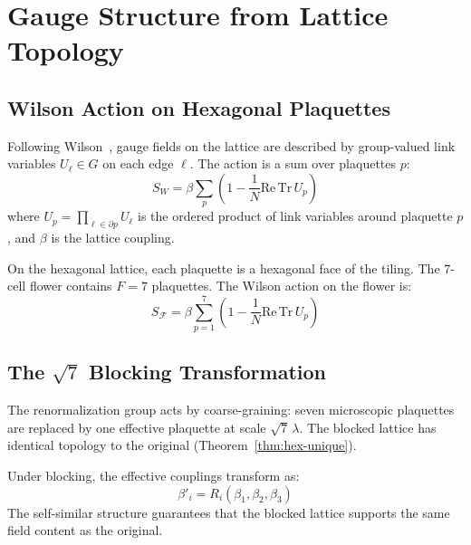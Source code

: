 \documentclass[12pt,a4paper]{article}
\theoremstyle{plain}
\theoremstyle{definition}
\begin{document}
\section{Gauge Structure from Lattice Topology}\label{sec:gauge}

\subsection{Wilson Action on Hexagonal Plaquettes}

Following Wilson~\cite{Wilson1974}, gauge fields on the lattice are described by group-valued link variables $U_\ell \in G$ on each edge $\ell$. The action is a sum over plaquettes $p$:
\begin{equation}\label{eq:wilson}
S_W = \beta \sum_p \left(1 - \frac{1}{N}\mathrm{Re}\,\mathrm{Tr}\, U_p\right)
\end{equation}
where $U_p = \prod_{\ell \in \partial p} U_\ell$ is the ordered product of link variables around plaquette $p$, and $\beta$ is the lattice coupling.

On the hexagonal lattice, each plaquette is a hexagonal face of the tiling. The 7-cell flower contains $F = 7$ plaquettes. The Wilson action on the flower is:
\begin{equation}
S_{\mathcal{F}} = \beta \sum_{p=1}^{7} \left(1 - \frac{1}{N}\mathrm{Re}\,\mathrm{Tr}\, U_p\right)
\end{equation}

\subsection{The $\sqrt{7}$ Blocking Transformation}

The renormalization group acts by coarse-graining: seven microscopic plaquettes are replaced by one effective plaquette at scale $\sqrt{7}\,\lambda$. The blocked lattice has identical topology to the original (Theorem~\ref{thm:hex-unique}).

Under blocking, the effective couplings transform as:
\begin{equation}
\beta'_i = R_i(\beta_1, \beta_2, \beta_3)
\end{equation}
The self-similar structure guarantees that the blocked lattice supports the same field content as the original.
\end{document}
